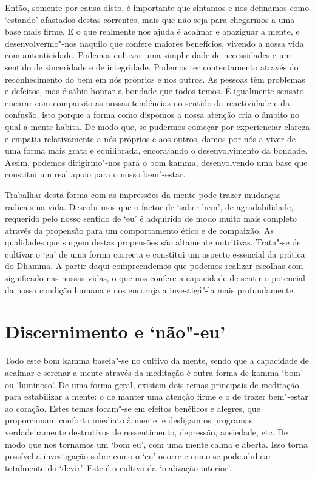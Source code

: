 Então, somente por causa disto, é importante que sintamos e nos definamos como
`estando' afastados destas correntes, mais que não seja para chegarmos a uma
base mais firme. E o que realmente nos ajuda é acalmar e apaziguar a mente, e
desenvolvermo"-nos naquilo que confere maiores benefícios, vivendo a nossa vida
com autenticidade. Podemos cultivar uma simplicidade de necessidades e um
sentido de sinceridade e de integridade. Podemos ter contentamento através do
reconhecimento do bem em nós próprios e nos outros. As pessoas têm problemas e
defeitos, mas é sábio honrar a bondade que todos temos. É igualmente sensato
encarar com compaixão as nossas tendências no sentido da reactividade e da
confusão, isto porque a forma como dispomos a nossa atenção cria o âmbito no
qual a mente habita. De modo que, se pudermos começar por experienciar clareza e
empatia relativamente a nós próprios e aos outros, damos por nós a viver de uma
forma mais grata e equilibrada, encorajando o desenvolvimento da bondade. Assim,
podemos dirigirmo"-nos para o bom kamma, desenvolvendo uma base que constitui um
real apoio para o nosso bem"-estar.

Trabalhar desta forma com as impressões da mente pode trazer mudanças radicais
na vida. Descobrimos que o factor de `saber bem', de agradabilidade, requerido
pelo nosso sentido de `eu' é adquirido de modo muito mais completo através da
propensão para um comportamento ético e de compaixão. As qualidades que surgem
destas propensões são altamente nutritivas. Trata"-se de cultivar o `eu' de uma
forma correcta e constitui um aspecto essencial da prática do Dhamma. A partir
daqui compreendemos que podemos realizar escolhas com significado nas nossas
vidas, o que nos confere a capacidade de sentir o potencial da nossa condição
humana e nos encoraja a investigá"-la mais profundamente.

\section{Discernimento e `não"-eu\kern -0.5pt'}

Todo este bom kamma baseia"-se no cultivo da mente, sendo que a capacidade de
acalmar e serenar a mente através da meditação é outra forma de kamma `bom' ou
`luminoso'. De uma forma geral, existem dois temas principais de meditação para
estabilizar a mente: o de manter uma atenção firme e o de trazer bem"-estar ao
coração. Estes temas focam"-se em efeitos benéficos e alegres, que proporcionam
conforto imediato à mente, e desligam os programas verdadeiramente destrutivos
de ressentimento, depressão, ansiedade, etc. De modo que nos tornamos um `bom
eu', com uma mente calma e aberta. Isso torna possível a investigação sobre como
o `eu' ocorre e como se pode abdicar totalmente do `devir'. Este é o cultivo da
`realização interior'.

